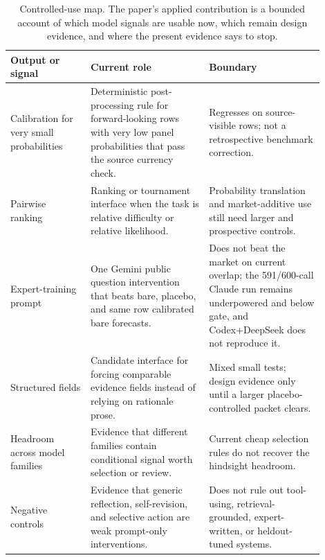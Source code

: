 \documentclass[11pt]{article}
\begin{document}
\begin{table}[htbp]
\centering
\begingroup
\setlength{\tabcolsep}{3pt}
\renewcommand{\arraystretch}{0.95}
\small
\begin{tabular}{@{}L{0.23\linewidth} L{0.34\linewidth} L{0.33\linewidth}@{}}
\toprule
Output or signal & Current role & Boundary \\
\midrule
Calibration for very small probabilities & Deterministic post-processing rule for forward-looking rows with very low panel probabilities that pass the source currency check. & Regresses on source-visible rows; not a retrospective benchmark correction. \\
Pairwise ranking & Ranking or tournament interface when the task is relative difficulty or relative likelihood. & Probability translation and market-additive use still need larger and prospective controls. \\
Expert-training prompt & One Gemini public question intervention that beats bare, placebo, and same row calibrated bare forecasts. & Does not beat the market on current overlap; the 591/600-call Claude run remains underpowered and below gate, and Codex+DeepSeek does not reproduce it. \\
Structured fields & Candidate interface for forcing comparable evidence fields instead of relying on rationale prose. & Mixed small tests; design evidence only until a larger placebo-controlled packet clears. \\
Headroom across model families & Evidence that different families contain conditional signal worth selection or review. & Current cheap selection rules do not recover the hindsight headroom. \\
Negative controls & Evidence that generic reflection, self-revision, and selective action are weak prompt-only interventions. & Does not rule out tool-using, retrieval-grounded, expert-written, or heldout-tuned systems. \\
\bottomrule
\end{tabular}
\endgroup
\caption{Controlled-use map. The paper's applied contribution is a bounded account of which model signals are usable now, which remain design evidence, and where the present evidence says to stop.}
\label{tab:applied-outputs}
\end{table}
\end{document}
